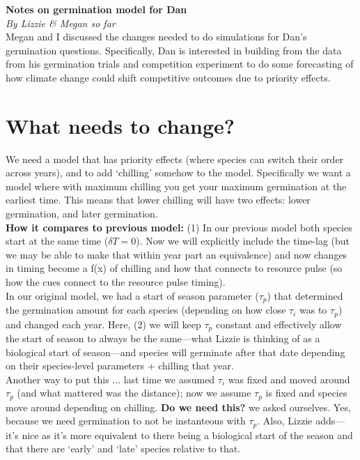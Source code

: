 \documentclass[11pt,letter]{article}
\begin{document}

\renewcommand{\refname}{\CHead{}}


{\bf Notes on germination model for Dan}\\
\emph{By Lizzie \& Megan so far}\\

Megan and I discussed the changes needed to do simulations for Dan's germination questions. Specifically, Dan is interested in building from the data from his germination trials and competition experiment to do some forecasting of how climate change could shift competitive outcomes due to priority effects.

\section{What needs to change?}

We need a model that has priority effects (where species can switch their order across years), and to add `chilling' somehow to the model. Specifically we want a model where with maximum chilling you get your maximum germination at the earliest time. This means that lower chilling will have two effects: lower germination, and later germination. \\

{\bf How it compares to previous model:} 
(1) In our previous model both species start at the same time ($\delta T = 0$). Now we will explicitly include the time-lag (but we may be able to make that within year part an equivalence) and now changes in timing become a f(x) of chilling and how that connects to resource pulse (so how the cues connect to the resource pulse timing).\\

In our original model, we had a start of season parameter ($\tau_p$) that determined the germination amount for each species (depending on how close $\tau_i$ was to $\tau_p$) and changed each year. Here, (2) we will keep $\tau_p$ constant and effectively allow the start of season to always be the same---what Lizzie is thinking of as a biological start of season---and species will germinate after that date depending on their species-level parameters + chilling that year. \\

Another way to put this ... last time we assumed $\tau_i$ was fixed and moved around $\tau_p$ (and what mattered was the distance); now we assume $\tau_p$ is fixed and species move around depending on chilling. {\bf Do we need this?} we asked ourselves. Yes, because we need germination to not be instanteous with $\tau_p$. Also, Lizzie adds---it's nice as it's more equivalent to there being a biological start of the season and that there are `early' and `late' species relative to that.
\end{document}
